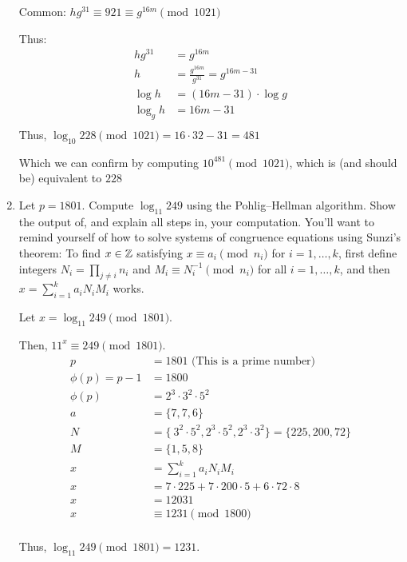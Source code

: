 \begin{problem}
\begin{enumerate}
\begin{Answer}
\begin{multicols*}{2}
        \noindent
        
        \noindent
        Common: $hg^{31} \equiv 921 \equiv g^{16m} \pmod{1021}$

        \noindent
        Thus:
        \begin{align*}
          hg^{31} &= g^{16m} \\
          h &= \frac{g^{16m}}{g^{31}} = g^{16m - 31} \\
          \log h &= (16m - 31) \cdot \log g \\
          \log_{g}{h} &= 16m - 31 \\
        \end{align*}
        Thus, $\log_{10} 228 \pmod {1021} = 16 \cdot{32} - 31 = 481$

        \noindent
        Which we can confirm by computing $10^{481} \pmod{1021}$, which is (and should be) equivalent to $228$
      \end{multicols*}
    \end{Answer}
    
    \item Let $p = 1801$.  Compute $\log_{11} 249$ using the
    Pohlig--Hellman algorithm.  Show the output of, and explain all steps
    in, your computation.  You'll want to remind yourself of how to solve
    systems of congruence equations using Sunzi's theorem: To find $x \in
    \mathbb{Z}$ satisfying $x \equiv a_i \pmod {n_i}$ for $i=1,\dotsc,k$, first
    define integers $N_i = \prod_{j\neq i} n_i$ and $M_i \equiv N_i^{-1}
    \pmod {n_i}$ for all $i = 1,\dotsc,k$, and then $x = \sum_{i=1}^k a_i
    N_i M_i$ works.
    \begin{Answer}
      Let $x = \log_{11} 249 \pmod{1801}$.

      \noindent
      Then, $11^x \equiv 249 \pmod{1801}$.
      \begin{align*}
        p &= 1801 \text{      (This is a prime number)}\\
        \phi(p) = p - 1 &= 1800\\
        \phi(p) &= 2^3 \cdot 3^2 \cdot 5^2\\
        a &= \{ 7, 7, 6 \}\\
        N &= \{\ 3^2 \cdot 5^2, 2^3 \cdot 5^2, 2^3 \cdot 3^2\} = \{225, 200, 72\}\\
        M &= \{ 1, 5, 8 \}\\
        x &= \sum_{i=1}^k a_i N_i M_i \\
        x &= 7 \cdot 225 + 7 \cdot 200 \cdot 5 + 6 \cdot 72 \cdot 8\\
        x &= 12031\\
        x &\equiv 1231 \pmod{1800}\\
      \end{align*}
      
      \noindent
      Thus, $\log_{11} 249 \pmod{1801} = 1231$.
    \end{Answer}
  \end{enumerate}
\end{problem}
